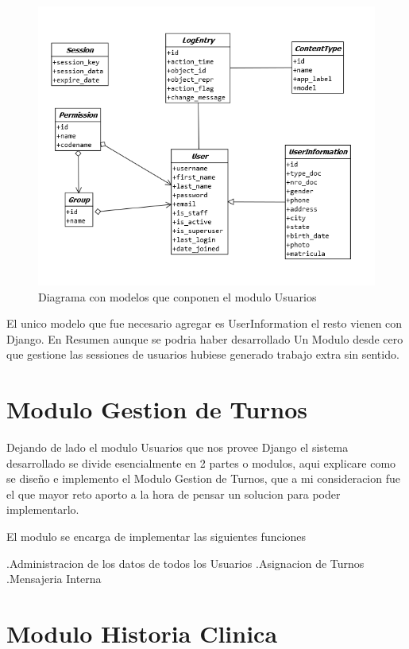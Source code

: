 \begin{figure}[H]
    \centering
    \includegraphics[scale=0.7]{resourse/uml-users.png}
    \caption{Diagrama con modelos que conponen el modulo Usuarios}
    \label{fig:07}
\end{figure}

El unico modelo que fue necesario agregar es UserInformation el resto vienen
con Django. En Resumen aunque se podria haber desarrollado Un Modulo desde
 cero que gestione las sessiones de usuarios hubiese generado trabajo extra sin
 sentido.

\section{Modulo Gestion de Turnos}

Dejando de lado el modulo Usuarios que nos provee Django el sistema desarrollado 
se divide esencialmente en 2 partes o modulos, aqui explicare como se dise\~no e
implemento el Modulo Gestion de Turnos, que a mi consideracion fue el que mayor
reto aporto a la hora de pensar un solucion para poder implementarlo.

El modulo se encarga de implementar las siguientes funciones

.Administracion de los datos de todos los Usuarios
.Asignacion de Turnos
.Mensajeria Interna



\section{Modulo Historia Clinica}

